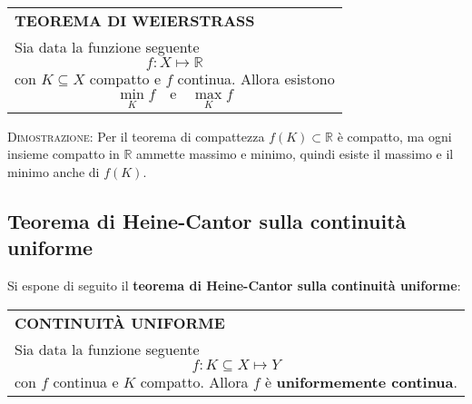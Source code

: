 \documentclass[a4paper]{extarticle}
\renewcommand\arraystretch{}
\begin{document}
\vspace{1em}
\setlength{\tabcolsep}{14pt}
\renewcommand{\arraystretch}{2}
\noindent
\begin{tabularx}{\textwidth}{@{}|P|@{}}
    \hline
    {\textbf{TEOREMA DI WEIERSTRASS}}\\
    \parbox{\linewidth}{Sia data la funzione seguente
    \[f : X \longmapsto \mathbb{R}\]
    con $K \subseteq X$ compatto e $f$ continua. Allora esistono
    \[\underset{K}{\min} f \hspace{1em} \text{e} \hspace{1em} \underset{K}{\max} f\]\vspace{-3mm}}\\
    \hline
\end{tabularx}

\vspace{2em}
\noindent
\normalfont \normalsize
\textsc{Dimostrazione}: Per il teorema di compattezza $f(K) \subset \mathbb{R}$ è compatto, ma ogni insieme compatto in $\mathbb{R}$ ammette massimo e minimo, quindi esiste il massimo e il minimo anche di $f(K)$.

\vspace{1em}
\noindent
\subsection{Teorema di Heine-Cantor sulla continuità uniforme}
Si espone di seguito il \textbf{teorema di Heine-Cantor sulla continuità uniforme}:

\vspace{1em}
\setlength{\tabcolsep}{14pt}
\renewcommand{\arraystretch}{2}
\noindent
\begin{tabularx}{\textwidth}{@{}|P|@{}}
    \hline
    {\textbf{CONTINUITÀ UNIFORME}}\\
    \parbox{\linewidth}{Sia data la funzione seguente
    \[f : K \subseteq X \longmapsto Y\]
    con $f$ continua e $K$ compatto. Allora $f$ è \textbf{uniformemente continua}.\vspace{3mm}}\\
    \hline
\end{tabularx}
\end{document}
